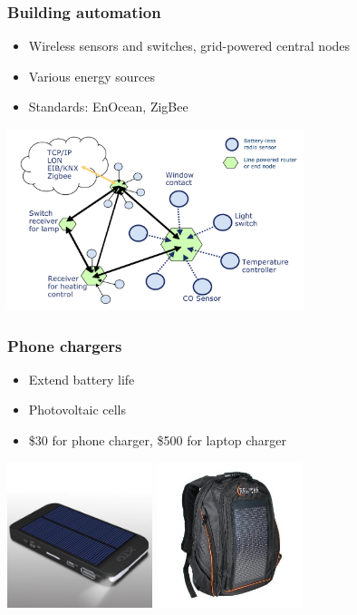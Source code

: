 \documentclass{beamer}
\begin{document}
\begin{frame}
  \frametitle{Building automation}

   \begin{itemize}
    \item Wireless sensors and switches, grid-powered central nodes
    \item Various energy sources
    \item Standards: EnOcean, ZigBee
   \end{itemize}

\begin{center}
\includegraphics[height=150pt]{./Slike/EnOcean-shema} 
\end{center}

\end{frame}

\begin{frame}
  \frametitle{Phone chargers}

\begin{itemize}
 \item Extend battery life
 \item Photovoltaic cells
 \item \$30 for phone charger, \$500 for laptop charger
\end{itemize}

\begin{center}
\includegraphics[height=120pt]{./Slike/phone-charger}
\includegraphics[height=120pt]{./Slike/solar-backpack}
\end{center}

\end{frame}
\end{document}
